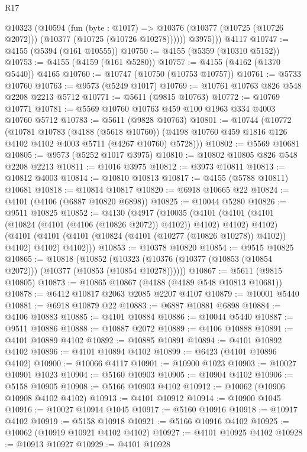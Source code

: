 \begin{lexlean}{R17}
\begin{coremodule}
        @10323
          (@10594
            (fun (byte : @1017) =>
            @10376 (@10377 (@10725 (@10726 @2072))) (@10377 (@10725 (@10726 @10278))))))
          @3975)))
    @4117
@10747 := @4155 (@5394 (@161 @10555))
@10750 := @4155 (@5359 (@10310 @5152))
@10753 := @4155 (@4159 (@161 @5280))
@10757 := @4155 (@4162 (@1370 @5440)) @4165
@10760 := @10747 (@10750 (@10753 @10757))
@10761 := @5733 @10760
@10763 := @9573 (@5249 @1017)
@10769 := @10761 @10763 @826 @548 @2208 @2213 @5712
@10771 := @5611 (@9815 @10763)
@10772 := @10769 @10771
@10781 := @5569 @10760 @10763 @459 @100 @1963 @334 @4003 @10760 @5712
@10783 := @5611 (@9828 @10763)
@10801 := @10744
    (@10772
      (@10781
        @10783
        (@4188 (@5618 @10760))
        (@4198 @10760 @459 @1816 @126 @4102 @4102 @4003 @5711 (@4267 @10760) @5728)))
@10802 := @5569 @10681
@10805 := @9573 (@5252 @1017 @3975)
@10810 := @10802 @10805 @826 @548 @2208 @2213
@10811 := @1016 @3975
@10812 := @3973 @10811
@10813 := @10812 @4003
@10814 := @10810 @10813
@10817 := @4155 (@5788 @10811) @10681
@10818 := @10814 @10817
@10820 := @6918 @10665 @22
@10824 := @4101 (@4106 (@6887 @10820 @6898))
@10825 := @10044 @5280
@10826 := @9511 @10825
@10852 := @4130
    (@4917
      (@10035
        (@4101 (@4101 (@4101 (@10824 (@4101 (@4106 (@10826 @2072)) @4102)) @4102) @4102) @4102)
        (@4101 (@4101 (@4101 (@10824 (@4101 (@10277 (@10826 @10278)) @4102)) @4102) @4102) @4102)))
@10853 := @10378 @10820
@10854 := @9515 @10825
@10865 := @10818
    (@10852 (@10323 (@10376 (@10377 (@10853 (@10854 @2072))) (@10377 (@10853 (@10854 @10278))))))
@10867 := @5611 (@9815 @10805)
@10873 := @10865 @10867 (@4188 (@4189 @548 @10813 @10681))
@10878 := @6412 @10817 @2063 @2085 @2207 @4107
@10879 := @10001 @5440
@10881 := @6918 @10879 @22
@10883 := @6887 @10881 @6898
@10884 := @4106 @10883
@10885 := @4101 @10884
@10886 := @10044 @5440
@10887 := @9511 @10886
@10888 := @10887 @2072
@10889 := @4106 @10888
@10891 := @4101 @10889 @4102
@10892 := @10885 @10891
@10894 := @4101 @10892 @4102
@10896 := @4101 @10894 @4102
@10899 := @6423 (@4101 @10896 @4102)
@10900 := @10066 @4117
@10901 := @10900 @1023
@10903 := @10027 @10901 @1023
@10904 := @5160 @10903
@10905 := @10904 @4102
@10906 := @5158 @10905
@10908 := @5166 @10903 @4102
@10912 := @10062 (@10906 @10908 @4102 @4102)
@10913 := @4101 @10912
@10914 := @10900 @1045
@10916 := @10027 @10914 @1045
@10917 := @5160 @10916
@10918 := @10917 @4102
@10919 := @5158 @10918
@10921 := @5166 @10916 @4102
@10925 := @10062 (@10919 @10921 @4102 @4102)
@10927 := @4101 @10925 @4102
@10928 := @10913 @10927
@10929 := @4101 @10928

\end{coremodule}
\end{lexlean}
